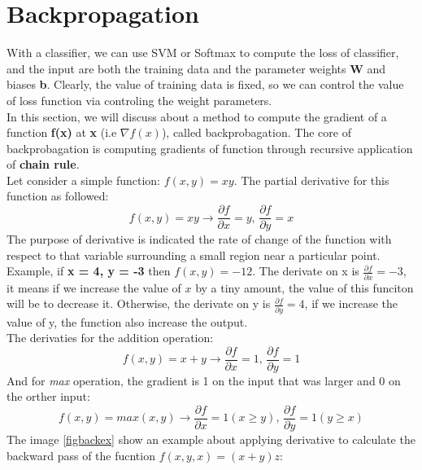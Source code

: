 \section{Backpropagation}
With a classifier, we can use SVM or Softmax to compute the loss of classifier, and the input are both the training data and the parameter weights \textbf{W} and biases \textbf{b}. Clearly, the value of training data is fixed, so we can control the value of loss function via controling the weight parameters.\\[0.2cm]
In this section, we will discuss about a method to compute the gradient of a function \textbf{f(x)} at \textbf{x} (i.e \textbf{$\nabla f(x)$}), called backprobagation. The core of backprobagation is computing gradients of function through recursive application of \textbf{chain rule}.\\[0.2cm]
Let consider a simple function: \textbf{$f(x,y) = xy$}. The partial derivative for this function as followed:
\begin{equation}
	f(x,y) = xy \rightarrow \frac{\partial{f}}{\partial{x}} = y \text{,       } \frac{\partial{f}}{\partial{y}} = x
\end{equation}
The purpose of derivative is indicated the rate of change of the function with respect to that variable surrounding a small region near a particular point. Example, if \textbf{x = 4, y = -3} then \textbf{$f(x,y) = -12$}. The derivate on x is \textbf{$\frac{\partial{f}}{\partial{x}} = -3$}, it means if we increase the value of $x$ by a tiny amount, the value of this funciton will be to decrease it. Otherwise, the derivate on y is \textbf{$\frac{\partial{f}}{\partial{y}} = 4$}, if we increase the value of y, the function also increase the output.\\[0.2cm]
The derivaties for the addition operation:
\begin{equation}
	f(x,y) = x + y \rightarrow \frac{\partial{f}}{\partial{x}} = 1 \text{, } \frac{\partial{f}}{\partial{y}} = 1
\end{equation}
And for \textit{max} operation, the gradient is 1 on the input that was larger and 0 on the orther input:
\begin{equation}
	f(x,y) = max(x,y) \rightarrow \frac{\partial{f}}{\partial{x}} = 1 (x \geq y) \text{, } \frac{\partial{f}}{\partial{y}} = 1 (y \geq x)
\end{equation}
The image \ref{figbackex} show an example about applying derivative to calculate the backward pass of the fucntion \textbf{$f(x,y,x) = (x+y)z$}:
